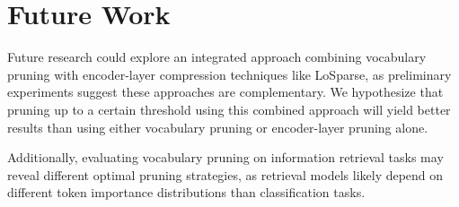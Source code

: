 \documentclass[twocolumn]{article}
\begin{document}
\section{Future Work}
Future research could explore an integrated approach combining vocabulary pruning with encoder-layer compression techniques like LoSparse, as preliminary experiments suggest these approaches are complementary. We hypothesize that pruning up to a certain threshold using this combined approach will yield better results than using either vocabulary pruning or encoder-layer pruning alone.

Additionally, evaluating vocabulary pruning on information retrieval tasks may reveal different optimal pruning strategies, as retrieval models likely depend on different token importance distributions than classification tasks.




\end{document}
